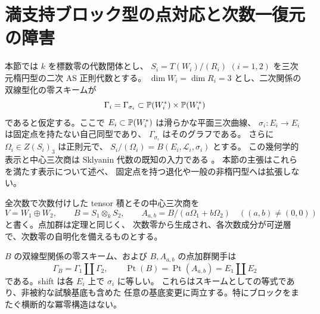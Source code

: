 \section{満支持ブロック型の点対応と次数一復元の障害}
\label{tbp:sec:points}

本節では $k$ を標数零の代数閉体とし、
$S_i=T(W_i)/(R_i)$ $(i=1,2)$ を三次元楕円型の二次 AS 正則代数とする。
$\dim W_i=\dim R_i=3$ とし、二次関係の双線型化の零スキームが
\[
 \Gamma_i=\Gamma_{\sigma_i}\subset
 \mathbb P(W_i^*)\times\mathbb P(W_i^*)
\]
であると仮定する。ここで $E_i\subset\mathbb P(W_i^*)$ は滑らかな平面三次曲線、
$\sigma_i:E_i\to E_i$ は固定点を持たない自己同型であり、
$\Gamma_{\sigma_i}$ はそのグラフである。
さらに $\Omega_i\in Z(S_i)_3$ は正則元で、
$S_i/(\Omega_i)=B(E_i,\mathcal L_i,\sigma_i)$ とする。
この幾何学的表示と中心三次商は Sklyanin 代数の既知の入力である
\cite[\S1, pp.~20--21]{GRSklyaninST}。
本節の主張はこれらを満たす表示について述べ、
固定点を持つ退化や一般の非楕円型へは拡張しない。

全次数で次数付けした tensor 積とその中心三次商を
\begin{equation}\label{tbp:eq:algebra}
 V=W_1\oplus W_2,\qquad
 B=S_1\otimes_k S_2,\qquad
 A_{a,b}=B/(a\Omega_1+b\Omega_2)
 \quad ((a,b)\ne(0,0))
\end{equation}
と書く。点加群は定理と同じく、
次数零から生成され、各次数成分が可逆層で、次数零の自明化を備えるものとする。

\begin{theorem}[二ブロックの点対応]\label{tbp:thm:point-graph}
$B$ の双線型関係の零スキーム、および $B,A_{a,b}$ の点加群関手は
\begin{equation}\label{tbp:eq:point-graph}
 \Gamma_B=\Gamma_1\amalg\Gamma_2,\qquad
 \operatorname{Pt}(B)=\operatorname{Pt}(A_{a,b})=E_1\amalg E_2
\end{equation}
である。shift は各 $E_i$ 上で $\sigma_i$ に等しい。
これらはスキームとしての等式であり、非被約な試験基底も含めた
任意の基底変更に両立する。特にブロックをまたぐ横断的な冪零構造はない。
\end{theorem}

